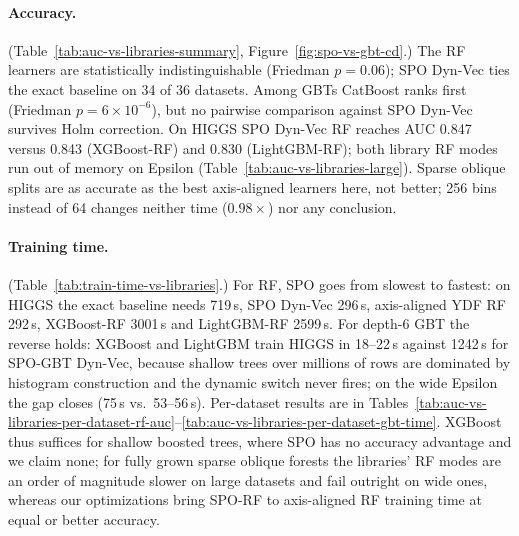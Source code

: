 \paragraph{Accuracy.}
(Table~\ref{tab:auc-vs-libraries-summary}, Figure~\ref{fig:spo-vs-gbt-cd}.) The RF learners are
statistically indistinguishable (Friedman $p=0.06$); SPO Dyn-Vec ties the exact baseline on 34
of 36 datasets. Among GBTs CatBoost ranks first (Friedman $p=6\times10^{-6}$), but no pairwise
comparison against SPO Dyn-Vec survives Holm correction. On HIGGS SPO Dyn-Vec RF reaches AUC
0.847 versus 0.843 (XGBoost-RF) and 0.830 (LightGBM-RF); both library RF modes run out of
memory on Epsilon (Table~\ref{tab:auc-vs-libraries-large}). Sparse oblique splits are as accurate as
the best axis-aligned learners here, not better; 256 bins instead of 64 changes neither time
($0.98\times$) nor any conclusion.



\paragraph{Training time.}
(Table~\ref{tab:train-time-vs-libraries}.) For RF, SPO goes from slowest to fastest: on HIGGS the
exact baseline needs 719\,s, SPO Dyn-Vec 296\,s, axis-aligned YDF RF 292\,s, XGBoost-RF
3001\,s and LightGBM-RF 2599\,s. For depth-6 GBT the reverse holds: XGBoost and LightGBM train
HIGGS in 18--22\,s against 1242\,s for SPO-GBT Dyn-Vec, because shallow trees over millions of
rows are dominated by histogram construction and the dynamic switch never fires; on the wide
Epsilon the gap closes (75\,s vs.\ 53--56\,s). Per-dataset results are in
Tables~\ref{tab:auc-vs-libraries-per-dataset-rf-auc}--\ref{tab:auc-vs-libraries-per-dataset-gbt-time}.
XGBoost thus suffices for shallow boosted trees, where SPO has no accuracy advantage and we
claim none; for fully grown sparse oblique forests the libraries' RF modes are an order of
magnitude slower on large datasets and fail outright on wide ones, whereas our optimizations
bring SPO-RF to axis-aligned RF training time at equal or better accuracy.


